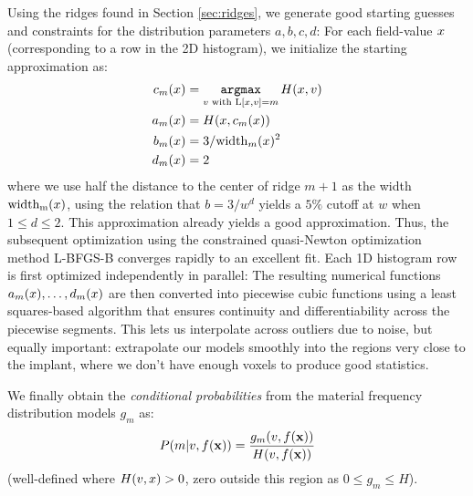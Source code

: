 Using the ridges found in Section \ref{sec:ridges}, we generate good starting
guesses and constraints for the distribution parameters
$a,b,c,d$:
For each field-value $x$ (corresponding to a row in the 2D histogram),
we initialize the starting approximation as:
\begin{equation}
  \label{eq:starting-guesses}
  \begin{split}
    c_m(x) &= \mathop{\mathtt{argmax}}_{v \text{ with }\mathrm{L}[x,v] = m} H(x,v)    \\    
    a_m(x) &= H(x,c_m(x))\\
    b_m(x) &= 3/\mathrm{width}_m(x)^2 \\
    d_m(x) &= 2
  \end{split}
\end{equation}
where we use half the distance to the center of ridge $m+1$ as the width
$\mathrm{width_m}(x)$, using the relation that $b = 3/w^d$ yields
a $5\percent$ cutoff at $w$ when $1\le d \le 2$. This approximation
already yields a good approximation. Thus, the subsequent
optimization using the constrained quasi-Newton optimization method L-BFGS-B\cite{BFGS}
converges rapidly to an excellent fit. Each 1D histogram row is first optimized
independently in parallel: The resulting numerical functions
$a_m(x),\ldots,d_m(x)$ are then converted into piecewise cubic
functions using a least squares-based algorithm that ensures continuity
and differentiability across the piecewise segments. This lets us interpolate across
outliers due to noise, but equally important:
extrapolate our models smoothly into the regions very close to the implant, where
we don't have enough voxels to produce good statistics.

We finally obtain the {\em conditional probabilities} from the material frequency distribution
models $g_m$ as:
\begin{equation}
  \label{eq:Pm}
  P(m|v,f(\mathbf{x})) = \frac{g_m(v,f(\mathbf{x}))}{H(v,f(\mathbf{x}))} 
\end{equation}
(well-defined where $H(v,x) > 0$, zero outside this region as $0\le g_m \le H$).



